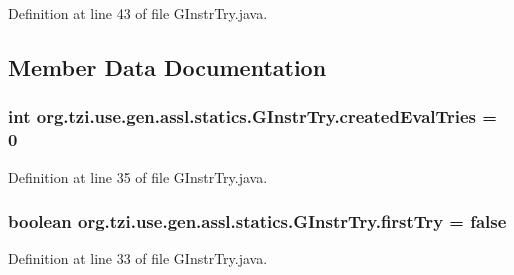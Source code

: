 Definition at line 43 of file G\-Instr\-Try.\-java.



\subsection{Member Data Documentation}
\hypertarget{classorg_1_1tzi_1_1use_1_1gen_1_1assl_1_1statics_1_1_g_instr_try_aeff1fece53d9d6ef237433377fd69568}{
\subsubsection[{created\-Eval\-Tries}]{\setlength{\rightskip}{0pt plus 5cm}int org.\-tzi.\-use.\-gen.\-assl.\-statics.\-G\-Instr\-Try.\-created\-Eval\-Tries = 0\hspace{0.3cm}{\ttfamily [protected]}}}\label{classorg_1_1tzi_1_1use_1_1gen_1_1assl_1_1statics_1_1_g_instr_try_aeff1fece53d9d6ef237433377fd69568}


Definition at line 35 of file G\-Instr\-Try.\-java.

\hypertarget{classorg_1_1tzi_1_1use_1_1gen_1_1assl_1_1statics_1_1_g_instr_try_acab3cf9a78ceb695d8d240c2cb8680d2}{
\subsubsection[{first\-Try}]{\setlength{\rightskip}{0pt plus 5cm}boolean org.\-tzi.\-use.\-gen.\-assl.\-statics.\-G\-Instr\-Try.\-first\-Try = false\hspace{0.3cm}{\ttfamily [protected]}}}\label{classorg_1_1tzi_1_1use_1_1gen_1_1assl_1_1statics_1_1_g_instr_try_acab3cf9a78ceb695d8d240c2cb8680d2}


Definition at line 33 of file G\-Instr\-Try.\-java.

